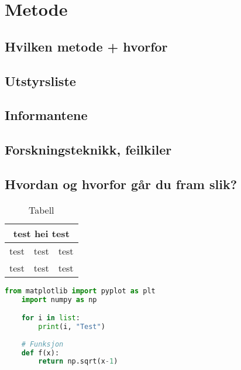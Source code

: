 \section{Metode}

\subsection{Hvilken metode + hvorfor}

\subsection{Utstyrsliste}

\subsection{Informantene}

\subsection{Forskningsteknikk, feilkiler}

\subsection{Hvordan og hvorfor går du fram slik?}

\begin{table}[h]
    \begin{center}
        \begin{tabular}{|c|c|c|}
            \hline
            \multicolumn{3}{|c|}{test hei test}\\
            \hline\hline
            test & test & test \\
            \hline
            test & test & test \\
            \hline
        \end{tabular}
        \caption{Tabell}
    \end{center}
\end{table}

\begin{lstlisting}[language=Python, caption=Python eksempel]
    from matplotlib import pyplot as plt
    import numpy as np

    for i in list:
        print(i, "Test")
    
    # Funksjon
    def f(x):
        return np.sqrt(x-1)
\end{lstlisting}

\newpage